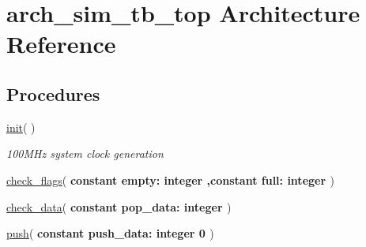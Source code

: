 \hypertarget{classfifo__tb_1_1arch__sim__tb__top}{}\section{arch\+\_\+sim\+\_\+tb\+\_\+top Architecture Reference}
\label{classfifo__tb_1_1arch__sim__tb__top}
\subsection*{Procedures}
 \begin{DoxyCompactItemize}
\item 
{\bfseries {\bfseries \textcolor{vhdlchar}{ }}} \hyperlink{classfifo__tb_1_1arch__sim__tb__top_a978c1602c1c480e86c09f3c3a1b8cc98}{init}(  )\hypertarget{classfifo__tb_1_1arch__sim__tb__top_a978c1602c1c480e86c09f3c3a1b8cc98}{}\label{classfifo__tb_1_1arch__sim__tb__top_a978c1602c1c480e86c09f3c3a1b8cc98}

\begin{DoxyCompactList}\small\item\em 100\+M\+Hz system clock generation \end{DoxyCompactList}\item 
{\bfseries {\bfseries \textcolor{vhdlchar}{ }}} \hyperlink{classfifo__tb_1_1arch__sim__tb__top_ab09a9572032a333afde267d6436d9978}{check\+\_\+flags}( {\bfseries \textcolor{keywordflow}{constant }\textcolor{vhdlchar}{empty\+: }\textcolor{stringliteral}{} {\bfseries \textcolor{comment}{integer}\textcolor{vhdlchar}{ }}}{\bfseries ,\textcolor{keywordflow}{constant }\textcolor{vhdlchar}{full\+: }\textcolor{stringliteral}{} {\bfseries \textcolor{comment}{integer}\textcolor{vhdlchar}{ }}} )\hypertarget{classfifo__tb_1_1arch__sim__tb__top_ab09a9572032a333afde267d6436d9978}{}\label{classfifo__tb_1_1arch__sim__tb__top_ab09a9572032a333afde267d6436d9978}

\item 
{\bfseries {\bfseries \textcolor{vhdlchar}{ }}} \hyperlink{classfifo__tb_1_1arch__sim__tb__top_a41e47bd09560c497495921a9b4dc814b}{check\+\_\+data}( {\bfseries \textcolor{keywordflow}{constant }\textcolor{vhdlchar}{pop\+\_\+data\+: }\textcolor{stringliteral}{} {\bfseries \textcolor{comment}{integer}\textcolor{vhdlchar}{ }}} )\hypertarget{classfifo__tb_1_1arch__sim__tb__top_a41e47bd09560c497495921a9b4dc814b}{}\label{classfifo__tb_1_1arch__sim__tb__top_a41e47bd09560c497495921a9b4dc814b}

\item 
{\bfseries {\bfseries \textcolor{vhdlchar}{ }}} \hyperlink{classfifo__tb_1_1arch__sim__tb__top_a1a67c6919fd2df4fb49262c9b52eeed8}{push}( {\bfseries \textcolor{keywordflow}{constant }\textcolor{vhdlchar}{push\+\_\+data\+: }\textcolor{stringliteral}{} {\bfseries \textcolor{comment}{integer}\textcolor{vhdlchar}{ }\textcolor{vhdlchar}{ }\textcolor{vhdlchar}{ } \textcolor{vhdldigit}{0} \textcolor{vhdlchar}{ }}} )\hypertarget{classfifo__tb_1_1arch__sim__tb__top_a1a67c6919fd2df4fb49262c9b52eeed8}{}\label{classfifo__tb_1_1arch__sim__tb__top_a1a67c6919fd2df4fb49262c9b52eeed8}


\end{DoxyCompactItemize}
